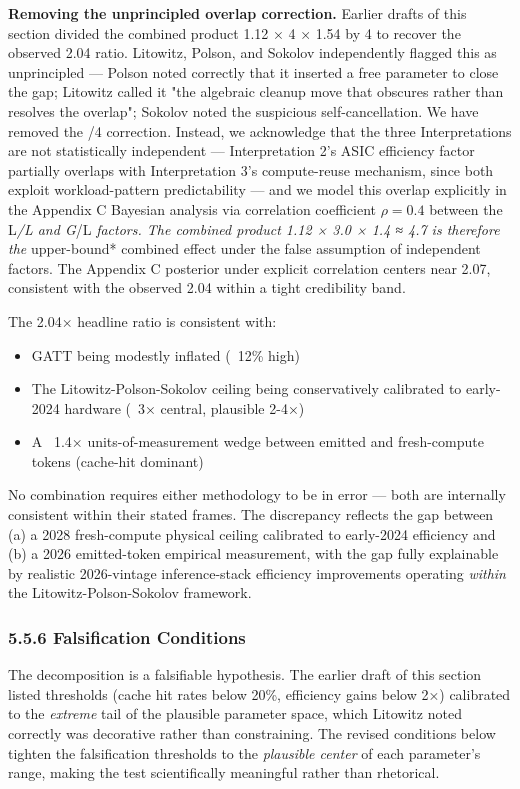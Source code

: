 \documentclass[11pt,a4paper]{article}
\begin{document}
\textbf{Removing the unprincipled overlap correction.} Earlier drafts of this section divided the combined product 1.12 × 4 × 1.54 by 4 to recover the observed 2.04 ratio. Litowitz, Polson, and Sokolov independently flagged this as unprincipled --- Polson noted correctly that it inserted a free parameter to close the gap; Litowitz called it "the algebraic cleanup move that obscures rather than resolves the overlap"; Sokolov noted the suspicious self-cancellation. We have removed the /4 correction. Instead, we acknowledge that the three Interpretations are not statistically independent --- Interpretation 2's ASIC efficiency factor partially overlaps with Interpretation 3's compute-reuse mechanism, since both exploit workload-pattern predictability --- and we model this overlap explicitly in the Appendix C Bayesian analysis via correlation coefficient $\rho = 0.4$ between the L\emph{/L and G}/L\emph{ factors. The combined product 1.12 × 3.0 × 1.4 ≈ 4.7 is therefore the }upper-bound* combined effect under the false assumption of independent factors. The Appendix C posterior under explicit correlation centers near 2.07, consistent with the observed 2.04 within a tight credibility band.

The 2.04× headline ratio is consistent with:
\begin{itemize}
  \item GATT being modestly inflated (~12\% high)
  \item The Litowitz-Polson-Sokolov ceiling being conservatively calibrated to early-2024 hardware (~3× central, plausible 2-4×)
  \item A ~1.4× units-of-measurement wedge between emitted and fresh-compute tokens (cache-hit dominant)
\end{itemize}

No combination requires either methodology to be in error --- both are internally consistent within their stated frames. The discrepancy reflects the gap between (a) a 2028 fresh-compute physical ceiling calibrated to early-2024 efficiency and (b) a 2026 emitted-token empirical measurement, with the gap fully explainable by realistic 2026-vintage inference-stack efficiency improvements operating \emph{within} the Litowitz-Polson-Sokolov framework.

\subsubsection{5.5.6 Falsification Conditions}

The decomposition is a falsifiable hypothesis. The earlier draft of this section listed thresholds (cache hit rates below 20\%, efficiency gains below 2×) calibrated to the \emph{extreme} tail of the plausible parameter space, which Litowitz noted correctly was decorative rather than constraining. The revised conditions below tighten the falsification thresholds to the \emph{plausible center} of each parameter's range, making the test scientifically meaningful rather than rhetorical.
\end{document}
